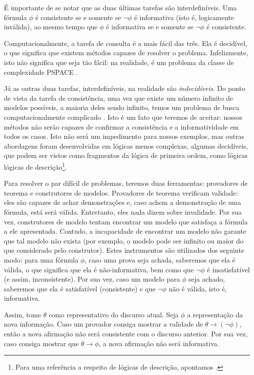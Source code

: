 	É importante de se notar que as duas últimas tarefas são interdefiníveis. Uma fórmula $\phi$ é consistente se e somente se $\neg \phi$ é informativa (isto é, logicamente inválida), ao mesmo tempo que $\phi$ é informativa se e somente se $\neg \phi$ é consistente.
	
	Computacionalmente, a tarefa de consulta é a mais fácil das três. Ela é decidível, o que significa que existem métodos capazes de resolver o problema.  Infelizmente, isto não significa que seja tão fácil: na realidade, é um problema da classe de complexidade PSPACE \citep[p.~52]{Kolaitis2007}. \update
	
	Já as outras duas tarefas, interdefiníveis, na realidade são \textit{indecidíveis}. Do ponto de vista da tarefa de consistência, uma vez que existe um número infinito de modelos possíveis, a maioria deles sendo infinito, temos um problema de busca computacionalmente complicado \citep[pp.~50--54]{BlackburnBos:2005}. Isto é um fato que teremos de aceitar: nossos métodos não serão capazes de confirmar a consistência e a informatividade em todos os casos. Isto não será um impedimento para nossos exemplos, mas outras abordagens foram desenvolvidas em lógicas menos complexas, algumas decidíveis, que podem ser vistos como fragmentos da lógica de primeira ordem, como lógicas lógicas de descrição\footnote{Para uma referência a respeito de lógicas de descrição, apontamos \citet{description-logic}.}.
	
	Para resolver o par difícil de problemas, teremos duas ferramentas: provadores de teorema e construtores de modelos. Provadores de teorema verificam validade: eles são capazes de achar demonstrações e, caso achem a demonstração de uma fórmula, está será válida. Entretanto, eles nada dizem sobre invalidade. Por sua vez, construtores de modelo tentam encontrar um modelo que satisfaça a fórmula a ele apresentada. Contudo, a incapacidade de encontrar um modelo não garante que tal modelo não exista (por exemplo, o modelo pode ser infinito ou maior do que considerado pelo construtor).
		Estes instrumentos são utilizados dos seguinte modo: para uma fórmula $\phi$, caso uma prova seja achada, saberemos que ela é válida, o que significa que ela é não-informativa, bem como que $\neg \phi$ é insatisfatível (e assim, inconsistente). Por sua vez, caso um modelo para $\phi$ seja achado, saberemos que ela é satisfatível (consistente) e que $\neg \phi$ não é válida, isto é, informativa.
		
		Assim, tome $\theta$ como representativo do discurso atual. Seja $\phi$ a representação da nova informação. Caso um provador consiga mostrar a validade de $\theta \rightarrow (\neg \phi)$, então a nova afirmação não será consistente com o discurso anterior. Por sua vez, caso consiga mostrar que $\theta \rightarrow \phi$, a nova afirmação não será informativa.
		
